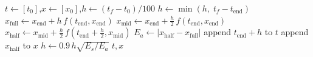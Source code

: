 \documentclass[border=6pt]{standalone}
\begin{document}
\begin{minipage}{4.6in}
\begin{algorithmic}[1]
  \State $t \gets [t_0]$,\quad $x \gets [x_0]$,\quad $h \gets (t_f - t_0)/100$
    \State $h \gets \min(h,\; t_f - t_{\text{end}})$
    \State $x_{\text{full}} \gets x_{\text{end}} + h\, f(t_{\text{end}}, x_{\text{end}})$ 
    \State $x_{\text{mid}} \gets x_{\text{end}} + \tfrac{h}{2}\, f(t_{\text{end}}, x_{\text{end}})$
    \State $x_{\text{half}} \gets x_{\text{mid}} + \tfrac{h}{2}\, f(t_{\text{end}} + \tfrac{h}{2}, x_{\text{mid}})$
    \State $E_a \gets \lvert x_{\text{half}} - x_{\text{full}} \rvert$
      \State append $t_{\text{end}} + h$ to $t$
      \State append $x_{\text{half}}$ to $x$
    \EndIf
    \State $h \gets 0.9\, h \sqrt{E_s / E_a}$ 
  \EndWhile
  \State \Return $t, x$
\EndFunction
\end{algorithmic}
\end{minipage}
\end{document}
